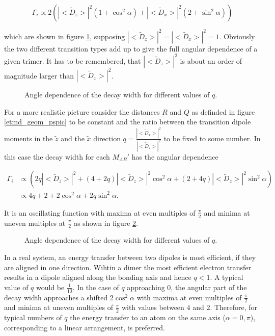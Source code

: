 \begin{equation}
  \Gamma_i \propto 2 \left( |<\tilde{D}_{z}>|^2 (1+\cos^2\alpha)
                           + |<\tilde{D}_x>|^2 (2+ \sin^2\alpha) \right)
\end{equation}

which are shown in figure \ref{figure:etmd_angle_dir}, supposing
$|<\tilde{D}_{z}>|^2 = |<\tilde{D}_x>|^2 = 1$.
Obviously the two different transition types add up to give the full
angular dependence of a given trimer. It has to be remembered, that
$|<\tilde{D}_{z}>|^2$ is about an order of magnitude larger than
$|<\tilde{D}_{x}>|^2$.

\begin{figure}[h]
 \centering
 
 \caption{Angle dependence of the decay width for different values of $q$.}
 \label{figure:etmd_angle_dir}
\end{figure}

For a more realistic picture
consider the distances $R$ and $Q$ as definded in figure \ref{etmd_geom_pspic}
to be constant and the ratio between the transition dipole moments
in the $\tilde{z}$ and the $\tilde{x}$ direction
$q=\frac{|<\tilde{D}_x>|^2}{|<\tilde{D}_z>|^2}$ to be fixed to some number.
In this case the decay width for each $M_{AB}'$ has the angular dependence

\begin{align}
 \Gamma_i &\propto \left( 2q |<\tilde{D}_{z}>|^2 +
                  (4+2q)|<\tilde{D}_{z}>|^2 \cos^2\alpha +
                  (2+4q)|<\tilde{D}_{z}>|^2 \sin^2\alpha \right) \\
          &\propto 4q + 2 + 2 \cos^2\alpha + 2q \sin^2\alpha .
\end{align}

It is an oscillating function with maxima at even multiples of $\frac \pi 2$
and minima at uneven multiples at $\frac \pi 2$ as shown in figure \ref{figure:etmd_angle}.

\begin{figure}[h]
 \centering
 
 \caption{Angle dependence of the decay width for different values of $q$.}
 \label{figure:etmd_angle}
\end{figure}

In a real system, an energy transfer between
two dipoles is most efficient, if they are aligned in one direction.
Wihtin a dimer the most efficient electron transfer results in a
dipole aligned along the bonding axis and hence $q<1$. A typical
value of $q$ would be $\frac 1{10}$. In the 
case of $q$ approaching 0, the angular part of
the decay width
approaches a shifted $2\cos^2 \alpha$ with maxima at even multiples of $\frac \pi2$
and minima at uneven multiples of $\frac \pi2$ with values between
$4$ and $2$.
Therefore, for typical numbers of $q$ the energy transfer
to an atom on the same axis ($\alpha = 0,\pi$), corresponding
to a linear arrangement, is preferred.

